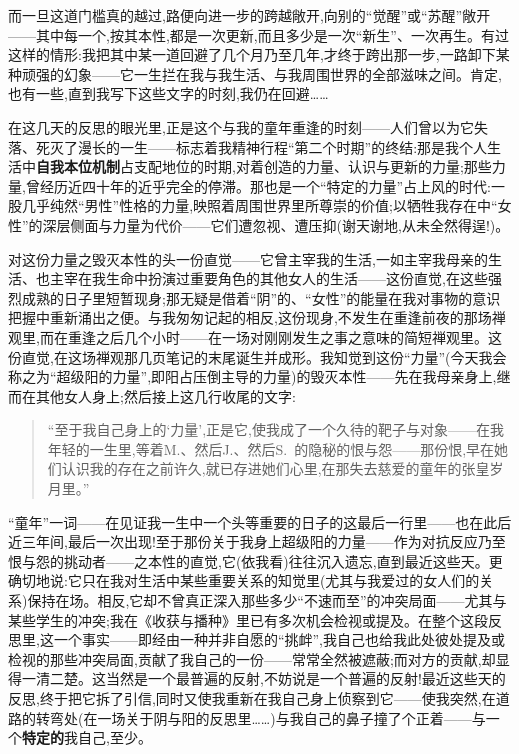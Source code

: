 而一旦这道门槛真的越过,路便向进一步的跨越敞开,向别的“觉醒”或“苏醒”敞开——其中每一个,按其本性,都是一次更新,而且多少是一次“新生”、一次再生。有过这样的情形:我把其中某一道回避了几个月乃至几年,才终于跨出那一步,一路卸下某种顽强的幻象——它一生拦在我与我生活、与我周围世界的全部滋味之间。肯定,也有一些,直到我写下这些文字的时刻,我仍在回避……

\dmark{}在这几天的反思的眼光里,正是这个与我的童年重逢的时刻——人们曾以为它失落、死灭了漫长的一生——标志着我精神行程“第二个时期”的终结:那是我个人生活中\textbf{自我本位机制}占支配地位的时期,对着创造的力量、认识与更新的力量;那些力量,曾经历近四十年的近乎完全的停滞。那也是一个“特定的力量”占上风的时代:一股几乎纯然“男性”性格的力量,映照着周围世界里所尊崇的价值;以牺牲我存在中“女性”的深层侧面与力量为代价——它们遭忽视、遭压抑(谢天谢地,从未全然得逞!)。

对这份力量之毁灭本性的头一份直觉——它曾主宰我的生活,一如主宰我母亲的生活、也主宰在我生命中扮演过重要角色的其他女人的生活——这份直觉,在这些强烈成熟的日子里短暂现身;那无疑是借着“阴”的、“女性”的能量在我对事物的意识把握中重新涌出之便。与我匆匆记起的相反,这份现身,不发生在重逢前夜的那场禅观里,而在重逢之后几个小时——在一场对刚刚发生之事之意味的简短禅观里。这份直觉,在这场禅观那几页笔记的末尾诞生并成形。我知觉到这份“力量”(今天我会称之为“超级阳的力量”,即阳占压倒主导的力量)的毁灭本性——先在我母亲身上,继而在其他女人身上;然后接上这几行收尾的文字:

\begin{quote}
“至于我自己身上的‘力量’,正是它,使我成了一个久待的靶子与对象——在我年轻的一生里,等着M.、然后J.、然后S.~的隐秘的恨与怨——那份恨,早在她们认识我的存在之前许久,就已存进她们心里,在那失去慈爱的童年的张皇岁月里。”
\end{quote}

“童年”一词——在见证我一生中一个头等重要的日子的这最后一行里——也在此后近三年间,最后一次出现!至于那份关于我身上超级阳的力量——作为对抗反应乃至恨与怨的挑动者——之本性的直觉,它(依我看)往往沉入遗忘,直到最近这些天。更确切地说:它只在我对生活中某些重要关系的知觉里(尤其与我爱过的女人们的关系)保持在场。相反,它却不曾真正深入那些多少“不速而至”的冲突局面——尤其与某些学生的冲突;我在《收获与播种》里已有多次机会检视或提及。在整个这段反思里,这一个事实——即经由一种并非自愿的“挑衅”,我自己也给我此处彼处提及或检视的那些冲突局面,贡献了我自己的一份——常常全然被遮蔽;而对方的贡献,却显得一清二楚。这当然是一个最普遍的反射,不妨说是一个普遍的反射!最近这些天的反思,终于把它拆了引信,同时又使我重新在我自己身上侦察到它——使我突然,在道路的转弯处(在一场关于阴与阳的反思里……)与我自己的鼻子撞了个正着——与一个\textbf{特定的}我自己,至少。

